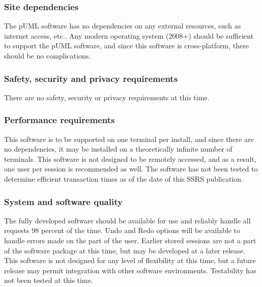 \documentclass[twoside,letterpaper]{article}
\begin{document}
\subsubsection[Site dependencies]{\rmfamily\bfseries\color{black}
Site dependencies}
{\color{black}
The pUML software has no dependencies on any external resources, such as internet access, etc..
Any modern operating system (2008+) should be sufficient to support the pUML software,
and since this software is cross-platform, there should be no complications.
}

\subsubsection[Safety, security and privacy requirements]{\rmfamily\bfseries\color{black}
Safety, security and privacy requirements}
{\color{black}
There are no safety, security or privacy requirements at this time.
}

\subsubsection[Performance requirements]{\rmfamily\bfseries\color{black}
Performance requirements}
{\color{black}
This software is to be supported on one terminal per install, and since there are no dependencies,
it may be installed on a theoretically infinite number of terminals. This software is not designed to
be remotely accessed, and as a result, one user per session is recommended as well.
The software has not been tested to determine efficient transaction times as of the date of this SSRS publication.
}

\subsubsection[System and software quality]{\rmfamily\bfseries\color{black} System
and software quality}
{\color{black}
The fully developed software should be available for use and reliably handle all requests 98 percent of the time.  
Undo and Redo options will be available to handle errors made on the part of the user.  
Earlier stored sessions are not a part of the software package at this time, but may be developed at a later release.
This software is not designed for any level of flexibility at this time, but a future release may permit
integration with other software environments. Testability has not been tested at this time.
}
\end{document}
